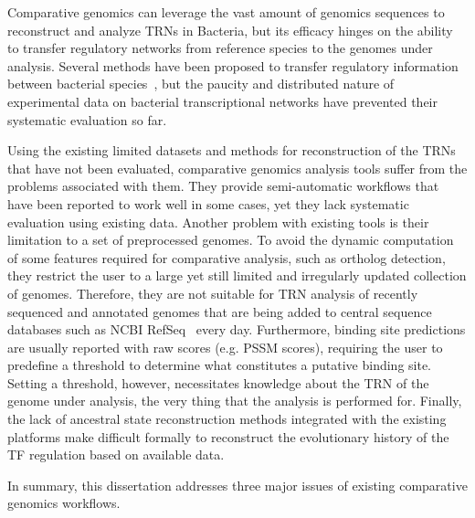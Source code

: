 Comparative genomics can leverage the vast amount of genomics sequences to
reconstruct and analyze TRNs in Bacteria, but its efficacy hinges on the
ability to transfer regulatory networks from reference species to the genomes
under analysis. Several methods have been proposed to transfer regulatory
information between bacterial species~\citep{babu2009methods,
  baumbach2010power}, but the paucity and distributed nature of experimental
data on bacterial transcriptional networks have prevented their systematic
evaluation so far.

Using the existing limited datasets and methods for reconstruction of the TRNs
that have not been evaluated, comparative genomics analysis tools suffer from
the problems associated with them. They provide semi-automatic workflows that
have been reported to work well in some cases, yet they lack systematic
evaluation using existing data. Another problem with existing tools is their
limitation to a set of preprocessed genomes. To avoid the dynamic computation
of some features required for comparative analysis, such as ortholog detection,
they restrict the user to a large yet still limited and irregularly updated
collection of genomes. Therefore, they are not suitable for TRN analysis of
recently sequenced and annotated genomes that are being added to central
sequence databases such as NCBI RefSeq~\citep{o2015reference} every
day. Furthermore, binding site predictions are usually reported with raw scores
(e.g. PSSM scores), requiring the user to predefine a threshold to determine
what constitutes a putative binding site. Setting a threshold, however,
necessitates knowledge about the TRN of the genome under analysis, the very
thing that the analysis is performed for. Finally, the lack of ancestral state
reconstruction methods integrated with the existing platforms make difficult
formally to reconstruct the evolutionary history of the TF regulation based on
available data.

In summary, this dissertation addresses three major issues of existing
comparative genomics workflows.

